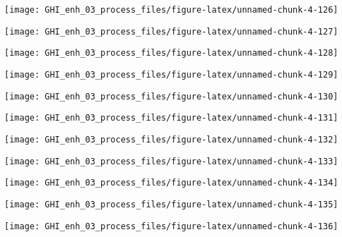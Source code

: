 \documentclass[
  10pt,
  a4paper,oneside]{article}
\begin{document}
\begin{center}\texttt{[image: GHI\_enh\_03\_process\_files/figure-latex/unnamed-chunk-4-126]} \end{center}

\begin{center}\texttt{[image: GHI\_enh\_03\_process\_files/figure-latex/unnamed-chunk-4-127]} \end{center}

\begin{center}\texttt{[image: GHI\_enh\_03\_process\_files/figure-latex/unnamed-chunk-4-128]} \end{center}

\begin{center}\texttt{[image: GHI\_enh\_03\_process\_files/figure-latex/unnamed-chunk-4-129]} \end{center}

\begin{center}\texttt{[image: GHI\_enh\_03\_process\_files/figure-latex/unnamed-chunk-4-130]} \end{center}

\begin{center}\texttt{[image: GHI\_enh\_03\_process\_files/figure-latex/unnamed-chunk-4-131]} \end{center}

\begin{center}\texttt{[image: GHI\_enh\_03\_process\_files/figure-latex/unnamed-chunk-4-132]} \end{center}

\begin{center}\texttt{[image: GHI\_enh\_03\_process\_files/figure-latex/unnamed-chunk-4-133]} \end{center}

\begin{center}\texttt{[image: GHI\_enh\_03\_process\_files/figure-latex/unnamed-chunk-4-134]} \end{center}

\begin{center}\texttt{[image: GHI\_enh\_03\_process\_files/figure-latex/unnamed-chunk-4-135]} \end{center}

\begin{center}\texttt{[image: GHI\_enh\_03\_process\_files/figure-latex/unnamed-chunk-4-136]} \end{center}
\end{document}
